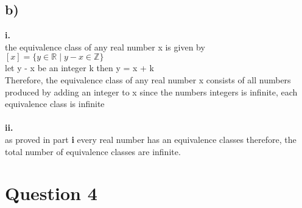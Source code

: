 \documentclass[11pt]{article}
\begin{document}
\subsection*{b)}
\textbf{i.} \\
the equivalence class of any real number x is given by \\
$[x] = \{y \in \mathbb{R} \;|\; y - x \in \mathbb{Z}\}$ \\
let y - x be an integer k then y = x + k \\
Therefore, the equivalence class of any real number x consists of all numbers
produced by adding an integer to x
since the numbers integers is infinite, each equivalence class is infinite
\\ \\
\textbf{ii.} \\
as proved in part \textbf{i} every real number has an equivalence classes therefore,
the total number of equivalence classes are infinite.

\section*{Question 4}
\end{document}
